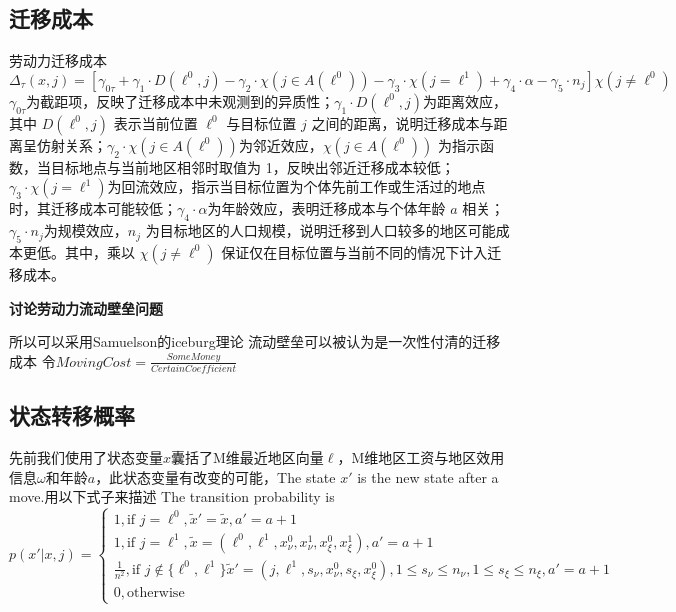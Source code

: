 \documentclass[a4paper,12pt]{article}
\begin{document}
\subsection{迁移成本}
劳动力迁移成本
\begin{equation}
  \Delta_\tau(x, j) = [\gamma_{0 \tau}+\gamma_1 \cdot D(\ell^0,j)-\gamma_2 \cdot\chi(j\in A(\ell^0))-\gamma_3 \cdot\chi(j=\ell^1)+\gamma_4 \cdot\alpha-\gamma_5 \cdot n_j]\chi(j\neq \ell^0)
\end{equation}
$\gamma_{0 \tau}$为截距项，反映了迁移成本中未观测到的异质性；$\gamma_1 \cdot D(\ell^0,j)$为距离效应，其中 $D(\ell^0, j)$ 表示当前位置 $\ell^0$ 与目标位置 $j$ 之间的距离，说明迁移成本与距离呈仿射关系；$\gamma_2 \cdot \chi(j\in A(\ell^0))$为邻近效应，$\chi(j\in A(\ell^0))$ 为指示函数，当目标地点与当前地区相邻时取值为 1，反映出邻近迁移成本较低；$\gamma_3 \cdot \chi(j=\ell^1)$为回流效应，指示当目标位置为个体先前工作或生活过的地点时，其迁移成本可能较低；$\gamma_4 \cdot \alpha$为年龄效应，表明迁移成本与个体年龄 $a$ 相关；$\gamma_5 \cdot n_j$为规模效应，$n_j$ 为目标地区的人口规模，说明迁移到人口较多的地区可能成本更低。其中，乘以 $\chi(j\neq \ell^0)$ 保证仅在目标位置与当前不同的情况下计入迁移成本。

\textbf{讨论劳动力流动壁垒问题}

所以可以采用Samuelson的iceburg理论 流动壁垒可以被认为是一次性付清的迁移成本
令$MovingCost = \frac{SomeMoney}{CertainCoefficient}$

\subsection{状态转移概率}
先前我们使用了状态变量$x$囊括了M维最近地区向量$\ell$，M维地区工资与地区效用信息$\omega$和年龄$a$，此状态变量有改变的可能，The state $x'$ is the new state after a move.用以下式子来描述
The transition probability is 
\begin{equation}
  p(x'|x,j)=
  \begin{cases}
    1, \text{if }j=\ell^0,\tilde x'=\tilde x,a'=a+1
    \\
    1, \text{if }j=\ell^1,\tilde x =(\ell^0,\ell^1,x_\nu^0,x_\nu^1,x_\xi^0,x_\xi^1),a'=a+1
    \\
    \frac{1}{n^2}, \text{if }j \notin \{\ell^0,\ell^1\}\tilde x'=(j,\ell^1,s_\nu,x_\nu^0,s_\xi,x_\xi^0),1\leqslant s_\nu \leqslant n_\nu,1\leqslant s_\xi \leqslant n_\xi,a'=a+1
    \\
    0, \text{otherwise}
  \end{cases}
\end{equation}
\end{document}
